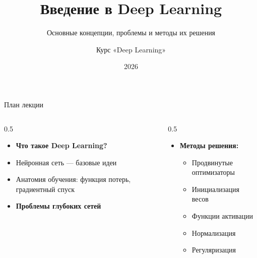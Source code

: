 \documentclass[aspectratio=169, 9pt]{beamer}
\title{Введение в Deep Learning}
\subtitle{Основные концепции, проблемы и методы их решения}
\author{Курс «Deep Learning»}
\date{2026}
\begin{document}
\begin{frame}
  \titlepage
\end{frame}

\begin{frame}{План лекции}
  \begin{columns}[T]
    \begin{column}{0.5\textwidth}
      \begin{itemize}
        \item \textbf{Что такое Deep Learning?}
        \item Нейронная сеть — базовые идеи
        \item Анатомия обучения: функция потерь, градиентный спуск
        \item \textbf{Проблемы глубоких сетей}
      \end{itemize}
    \end{column}
    \begin{column}{0.5\textwidth}
      \begin{itemize}
        \item \textbf{Методы решения:}
        \begin{itemize}
          \item Продвинутые оптимизаторы
          \item Инициализация весов
          \item Функции активации
          \item Нормализация
          \item Регуляризация
        \end{itemize}
      \end{itemize}
    \end{column}
  \end{columns}
\end{frame}
\end{document}
